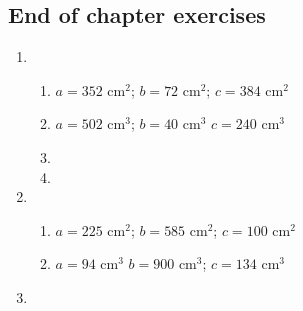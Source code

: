 \subsection{End of chapter exercises} %

\begin{enumerate}[itemsep=6pt, label=\textbf{\arabic*}. ] 
\item %

    \begin{enumerate}[noitemsep, label=\textbf{(\alph*)} ]
  \item $a = 352$ cm$^2$; $b = 72$ cm$^2$; $c= 384$ cm$^2$%
\item $a = 502$ cm$^3$; $b = 40$ cm$^3$ $c = 240$ cm$^3$%
\item %
\item %
 \end{enumerate}
\item %

    \begin{enumerate}[noitemsep, label=\textbf{(\alph*)} ]
 \item $a = 225$ cm$^2$; $b = 585$ cm$^2$; $c = 100$ cm$^2$%
\item $a = 94$ cm$^3$ $b = 900$ cm$^3$; $c = 134$ cm$^3$ %

\end{enumerate}

\item %
\end{enumerate}


